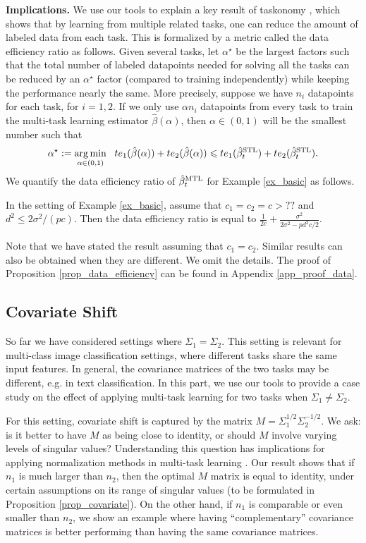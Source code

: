 \textbf{Implications.} We use our tools to explain a key result of taskonomy \cite{ZSSGM18}, which shows that by learning from multiple related tasks, one can reduce the amount of labeled data from each task.
This is formalized by a metric called the data efficiency ratio as follows.
Given several tasks, let $\alpha^{\star}$ be the largest factors such that the total number of labeled datapoints needed for solving all the tasks can be reduced by an $\alpha^{\star}$ factor (compared to training independently) while keeping the performance nearly the same.
More precisely, suppose we have $n_i$ datapoints for each task, for $i= 1, 2$.
If we only use $\alpha n_i$ datapoints from every task to train the multi-task learning estimator $\hat{\beta}(\alpha)$, then $\alpha \in (0, 1)$ will be the smallest number such that
\[ \alpha^{\star} :=\operatorname*{arg\,min}_{\alpha\in(0, 1)} ~~ te_1(\hat{\beta}(\alpha)) + te_2(\hat{\beta}(\alpha))\leqslant te_1(\hat{\beta}_t^{\text{STL}}) + te_2(\hat{\beta}_t^{\text{STL}}). \]
We quantify the data efficiency ratio of $\hat{\beta}_t^{\text{MTL}}$ for Example \ref{ex_basic} as follows.

\begin{proposition}\label{prop_data_efficiency}
	In the setting of Example \ref{ex_basic}, assume that $c_1 = c_2 = c > ??$ and $d^2 \le {2\sigma^2} /{(p c)}$.
	Then the data efficiency ratio is equal to $\frac{1}{2c} + \frac{\sigma^2}{2\sigma^2 - p d^2 c / 2}$.
\end{proposition}
Note that we have stated the result assuming that $c_1 = c_2$.
Similar results can also be obtained when they are different.
We omit the details.
The proof of Proposition \ref{prop_data_efficiency} can be found in Appendix \ref{app_proof_data}.




\subsection{Covariate Shift}

So far we have considered settings where $\Sigma_1 = \Sigma_2$.
This setting is relevant for multi-class image classification settings, where different tasks share the same input features.
In general, the covariance matrices of the two tasks may be different, e.g. in text classification.
In this part, we use our tools to provide a case study on the effect of applying multi-task learning for two tasks when $\Sigma_1 \neq \Sigma_2$.

For this setting, covariate shift is captured by the matrix $M = \Sigma_1^{1/2} \Sigma_2^{-1/2}$.
We ask: is it better to have $M$ as being close to identity, or should $M$ involve varying levels of singular values?
Understanding this question has implications for applying normalization methods in multi-task learning \cite{LV19,CBLR18,YKGLHF20}.
Our result shows that if $n_1$ is much larger than $n_2$, then the optimal $M$ matrix is equal to identity, under certain assumptions on its range of singular values (to be formulated in Proposition \ref{prop_covariate}).
On the other hand, if $n_1$ is comparable or even smaller than $n_2$, we show an example where having ``complementary'' covariance matrices is better performing than having the same covariance matrices.

